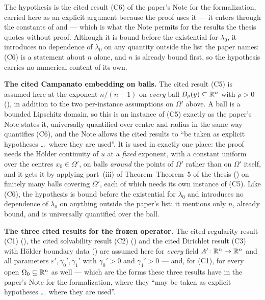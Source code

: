 \begin{theorem}[Theorem 6]
The hypothesis  is the cited result (C6) of the
paper's Note for the formalization, carried here as an explicit argument because
the proof uses it --- it enters through the constants of  and  --- which is what the
Note permits for the results the thesis quotes without proof.  Although it is
bound before the existential for $\lambda_0$, it introduces no dependence of
$\lambda_0$ on any quantity outside the list the paper names: (C6) is a statement
about $n$ alone, and $n$ is already bound first, so the hypothesis carries no
numerical content of its own.

\medskip
\noindent\textbf{The cited Campanato embedding on balls.}  The cited result
(C5) is assumed here at the exponent $n/(n-1)$ on \emph{every} ball
$B_\rho(y)\subseteq\mathbb{R}^n$ with $\rho>0$ (), in
addition to the two per-instance assumptions on $\Omega'$ above.  A ball is a
bounded Lipschitz domain, so this is an instance of (C5) exactly as the paper's
Note states it, universally quantified over centre and radius in the same way
 quantifies (C6), and the Note allows the
cited results to ``be taken as explicit hypotheses \ldots\ where they are
used''.  It is used in exactly one place: the proof needs the H\"older
continuity of $u$ at a \emph{fixed} exponent, with a constant uniform over the
centres $x_0\in\Omega'$, on balls \emph{around} the points of $\Omega'$ rather
than on $\Omega'$ itself, and it gets it by applying part~(iii) of
Theorem~Theorem~5 of the thesis () on finitely many balls
covering $\overline{\Omega'}$, each of which needs its own instance of (C5).
Like (C6), the hypothesis is bound before the existential for $\lambda_0$ and
introduces no dependence of $\lambda_0$ on anything outside the paper's list: it
mentions only $n$, already bound, and is universally quantified over the ball.

\medskip
\noindent\textbf{The three cited results for the frozen operator.}  The cited
regularity result (C1) (), the cited solvability
result (C2) () and the cited Dirichlet result (C3)
with H\"older boundary data () are assumed here
for \emph{every} field $A'\colon\mathbb{R}^n\to\mathbb{R}^n$ and all parameters
$\varepsilon',\gamma_0',\gamma_1'$ with $\gamma_0'>0$ and $\gamma_1'>0$ --- and,
for (C1), for every open $\Omega_0\subseteq\mathbb{R}^n$ as well --- which are the forms
these three results have in the paper's Note for the formalization, where they
``may be taken as explicit hypotheses \ldots\ where they are used''.


\end{theorem}
